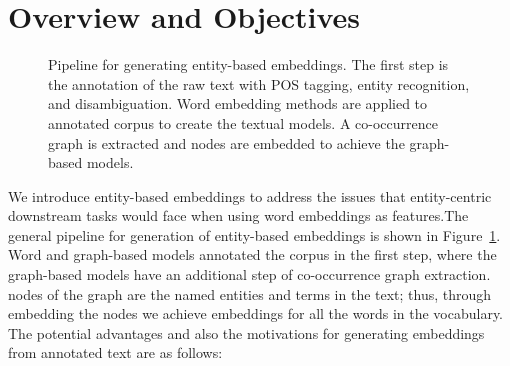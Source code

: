 \section{Overview and Objectives}\label{sec:entity_overview}
\begin{figure}
\centering 
\resizebox{0.97\textwidth}{0.32\textwidth}{      

}
\caption{Pipeline for generating entity-based embeddings. The first step is the annotation of the raw text with POS tagging, entity recognition, and disambiguation. Word embedding methods are applied to annotated corpus to create the textual models. A co-occurrence graph is extracted and nodes are embedded to achieve the graph-based models.}
\label{fig:entity_emebddings_pipline}
\end{figure}
We introduce entity-based embeddings to address the issues that entity-centric downstream tasks would face when using word embeddings as features.The general pipeline for generation of entity-based embeddings is shown in Figure~\ref{fig:entity_emebddings_pipline}. Word and graph-based models annotated the corpus in the first step, where the graph-based models have an additional step of co-occurrence graph extraction.  nodes of the graph are the named entities and terms in the text; thus, through embedding the nodes we achieve embeddings for all the words in the vocabulary. \\
The potential advantages and also the motivations for generating embeddings from annotated text are as follows: 
